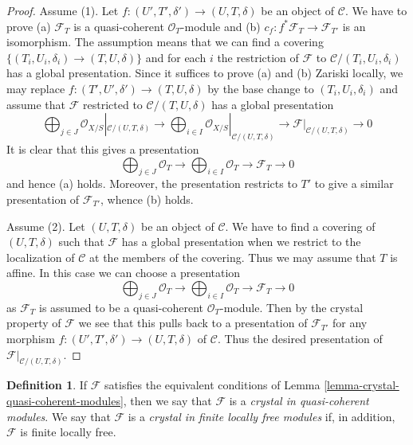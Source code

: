 \documentclass{stacks-project}
\theoremstyle{plain}
\theoremstyle{definition}
\newtheorem{definition}[subsection]{Definition}
\theoremstyle{remark}
\numberwithin{equation}{subsection}
\begin{document}
\begin{proof}
Assume (1). Let $f : (U', T', \delta') \to (U, T, \delta)$ be an object of
$\mathcal{C}$. We have to prove (a) $\mathcal{F}_T$ is a quasi-coherent
$\mathcal{O}_T$-module and (b) $c_f : f^*\mathcal{F}_T \to \mathcal{F}_{T'}$
is an isomorphism. The assumption means that we can find a covering
$\{(T_i, U_i, \delta_i) \to (T, U, \delta)\}$ and for each $i$
the restriction of $\mathcal{F}$ to $\mathcal{C}/(T_i, U_i, \delta_i)$
has a global presentation. Since it suffices to prove (a) and (b)
Zariski locally, we may replace $f : (T', U', \delta') \to (T, U, \delta)$
by the base change to $(T_i, U_i, \delta_i)$ and assume that $\mathcal{F}$
restricted to $\mathcal{C}/(T, U, \delta)$ has a global
presentation
$$
\bigoplus\nolimits_{j \in J}
\mathcal{O}_{X/S}|_{\mathcal{C}/(U, T, \delta)} \longrightarrow
\bigoplus\nolimits_{i \in I}
\mathcal{O}_{X/S}|_{\mathcal{C}/(U, T, \delta)} \longrightarrow
\mathcal{F}|_{\mathcal{C}/(U, T, \delta)}
\longrightarrow 0
$$
It is clear that this gives a presentation
$$
\bigoplus\nolimits_{j \in J} \mathcal{O}_T \longrightarrow
\bigoplus\nolimits_{i \in I} \mathcal{O}_T \longrightarrow
\mathcal{F}_T
\longrightarrow 0
$$
and hence (a) holds. Moreover, the presentation restricts to $T'$
to give a similar presentation of $\mathcal{F}_{T'}$, whence (b) holds.

\medskip\noindent
Assume (2). Let $(U, T, \delta)$ be an object of $\mathcal{C}$.
We have to find a covering of $(U, T, \delta)$ such that $\mathcal{F}$ has a
global presentation when we restrict to the localization of $\mathcal{C}$
at the members of the covering. Thus we may assume that $T$ is affine.
In this case we can choose a presentation
$$
\bigoplus\nolimits_{j \in J} \mathcal{O}_T \longrightarrow
\bigoplus\nolimits_{i \in I} \mathcal{O}_T \longrightarrow
\mathcal{F}_T
\longrightarrow 0
$$
as $\mathcal{F}_T$ is assumed to be a quasi-coherent $\mathcal{O}_T$-module.
Then by the crystal property of $\mathcal{F}$ we see that this pulls back
to a presentation of $\mathcal{F}_{T'}$ for any morphism
$f : (U', T', \delta') \to (U, T, \delta)$ of $\mathcal{C}$.
Thus the desired presentation of $\mathcal{F}|_{\mathcal{C}/(U, T, \delta)}$.
\end{proof}

\begin{definition}
\label{definition-crystal-quasi-coherent-modules}
If $\mathcal{F}$ satisfies the equivalent conditions of
Lemma \ref{lemma-crystal-quasi-coherent-modules}, then
we say that $\mathcal{F}$ is a
{\it crystal in quasi-coherent modules}.
We say that $\mathcal{F}$ is a {\it crystal in finite locally free modules}
if, in addition, $\mathcal{F}$ is finite locally free.
\end{definition}
\end{document}
